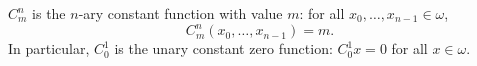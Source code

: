 $C_m^n$ is the $n$-ary constant function with value $m$: for all $x_0, \ldots, x_{n-1} \in \omega$,
$$C_m^n(x_0, \ldots, x_{n-1}) = m.$$
In particular, $C_0^1$ is the unary constant zero function: $C_0^1 x = 0$ for all $x \in \omega$.
